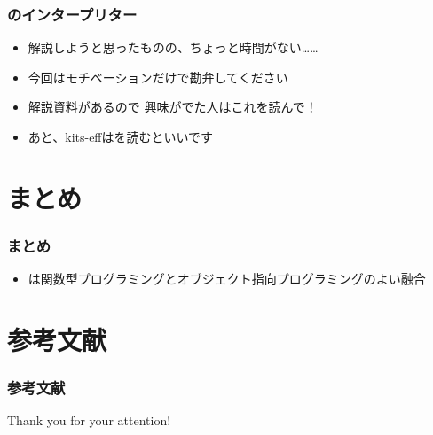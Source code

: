 \begin{frame}
  \frametitle{\Fujitask のインタープリター}

  \begin{itemize}
    \item<+-> 解説しようと思ったものの、ちょっと時間がない……

    \item<+-> 今回はモチベーションだけで勘弁してください

    \item<+-> 解説資料\cite{qiita_fujitask_eff}があるので
    興味がでた人はこれを読んで！

    \item<+-> あと、kits-effは\cite{shinchoku}を読むといいです
  \end{itemize}
\end{frame}

\section{まとめ}

\begin{frame}
  \frametitle{まとめ}

  \pause
  \begin{itemize}
    \item<+-> \Fujitask は関数型プログラミングとオブジェクト指向プログラミングのよい融合
  \end{itemize}
\end{frame}

\section*{参考文献}

\begin{frame}
  \frametitle{参考文献}

  
  \nocite{*}
  
\end{frame}

\begin{frame}
  \centering
  {\Huge Thank you for your attention!}
\end{frame}


